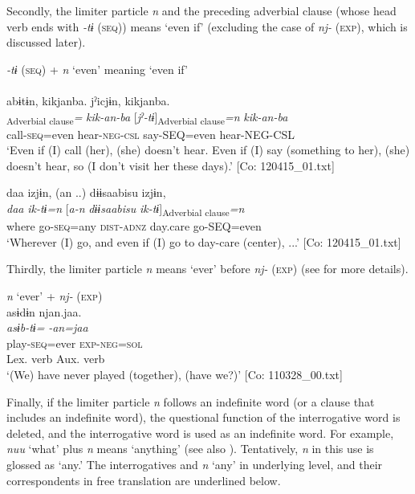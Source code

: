   Secondly, the limiter particle \textit{n} and the preceding adverbial clause (whose head verb ends with \textit{{}-tɨ} (\textsc{seq})) means ‘even if’ (excluding the case of \textit{nj-} (\textsc{exp}), which is discussed later).

\ea\label{ex:10.19}   \textit{{}-tɨ} (\textsc{seq}) + \textit{n} ‘even’ meaning ‘even if’\\
  \ea\relax  [= (8-103)]\\
      \glll    abɨtɨn,  kikjanba.  jˀicjɨn,  kikjanba.\\
      [\textit{abɨr-tɨ}]\textsubscript{Adverbial clause}\textit{=}  \textit{kik-an-ba}  [\textit{jˀ-tɨ}]\textsubscript{Adverbial clause}\textit{=n}  \textit{kik-an-ba}\\
      call-\textsc{seq}=even  hear{}-\textsc{neg}-\textsc{csl}  say-SEQ=even  hear{}-NEG-CSL\\
      \glt       ‘Even if (I) call (her), (she) doesn’t hear. Even if (I) say (something to her), (she) doesn’t hear, so (I don’t visit her these days).’ [Co: 120415\_01.txt]

  \ex  %
      \glll    daa  izjɨn,  {(an ..)}  {\textbar}dɨɨsaabisu{\textbar}  izjɨn,\\
      \textit{daa}  \textit{ik-tɨ=n}  [\textit{a-n}  \textit{dɨɨsaabisu}  \textit{ik-tɨ}]\textsubscript{Adverbial clause}\textit{=n}\\
      where  go-\textsc{seq}=any  \textsc{dist}-\textsc{adnz}  day.care  go-SEQ=even\\
      \glt       ‘Wherever (I) go, and even if (I) go to day-care (center), ...’ [Co: 120415\_01.txt]
    \z
\z

Thirdly, the limiter particle \textit{n} means ‘ever’ before \textit{nj-} (\textsc{exp}) (see  for more details).

\ea\label{ex:10.20}   \textit{n} ‘ever’ + \textit{nj-} (\textsc{exp})\\
  \gllll    asɨdɨn  njan.jaa.\\
    \textit{asɨb-tɨ=}  \textit{-an=jaa}\\
    play-\textsc{seq}=ever  \textsc{exp}-\textsc{neg}=\textsc{sol}\\
    {Lex. verb}  {Aux. verb}\\
   \glt ‘(We) have never played (together), (have we?)’ [Co: 110328\_00.txt]
\z

  Finally, if the limiter particle \textit{n} follows an indefinite word (or a clause that includes an indefinite word), the questional function of the interrogative word is deleted, and the interrogative word is used as an indefinite word. For example, \textit{nuu} ‘what’ plus \textit{n} means ‘anything’ (see also ). Tentatively, \textit{n} in this use is glossed as ‘any.’ The interrogatives and \textit{n} ‘any’ in underlying level, and their correspondents in free translation are underlined below.


